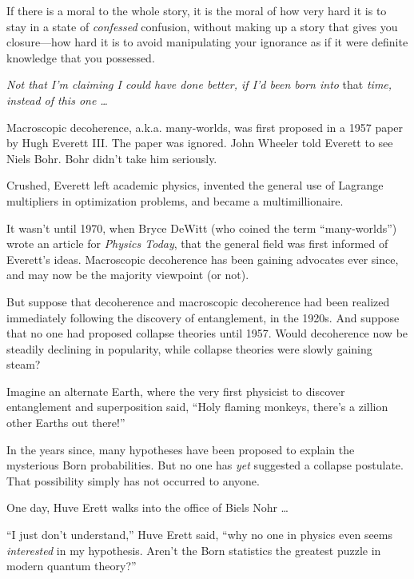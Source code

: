{
 If there is a moral to the whole story, it is the moral of how
very hard it is to stay in a state of \textit{confessed} confusion,
without making up a story that gives you closure---how hard it is to
avoid manipulating your ignorance as if it were definite knowledge that
you possessed.}

\myendsectiontext


{
 \textit{Not that I'm claiming I could have done
better, if I'd been born into} that \textit{time,
instead of this one \ldots} }

{
 Macroscopic decoherence, a.k.a. many-worlds, was first proposed in
a 1957 paper by Hugh Everett III. The paper was ignored. John Wheeler
told Everett to see Niels Bohr. Bohr didn't take him
seriously.}

{
 Crushed, Everett left academic physics, invented the general use
of Lagrange multipliers in optimization problems, and became a
multimillionaire.}

{
 It wasn't until 1970, when Bryce DeWitt (who
coined the term ``many-worlds'')
wrote an article for \textit{Physics Today}, that the general field was
first informed of Everett's ideas. Macroscopic
decoherence has been gaining advocates ever since, and may now be the
majority viewpoint (or not).}

{
 But suppose that decoherence and macroscopic decoherence had been
realized immediately following the discovery of entanglement, in the
1920s. And suppose that no one had proposed collapse theories until
1957. Would decoherence now be steadily declining in popularity, while
collapse theories were slowly gaining steam?}

{
 Imagine an alternate Earth, where the very first physicist to
discover entanglement and superposition said, ``Holy
flaming monkeys, there's a zillion other Earths out
there!''}

{
 In the years since, many hypotheses have been proposed to explain
the mysterious Born probabilities. But no one has \textit{yet}
suggested a collapse postulate. That possibility simply has not
occurred to anyone.}

{
 One day, Huve Erett walks into the office of Biels Nohr \ldots}

{
 ``I just don't
understand,'' Huve Erett said, ``why
no one in physics even seems \textit{interested} in my hypothesis.
Aren't the Born statistics the greatest puzzle in
modern quantum theory?''}


